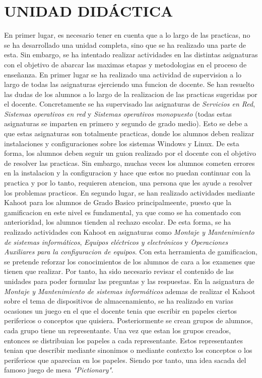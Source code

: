 \documentclass[spanish,12pt, a4paper,twoside]{paper}
\let\oldsection\section
\def\section{\cleardoublepage\oldsection}
\begin{document}
\section{UNIDAD DIDÁCTICA} %
\justify
En primer lugar, es necesario tener en cuenta que a lo largo de las practicas, no se ha desarrollado una unidad completa, sino que se ha realizado una parte de esta. Sin embargo, se ha intentado realizar actividades en las distintas asignaturas con el objetivo de abarcar las maximas etapas y metodologias en el proceso de enseñanza.
\justify
En primer lugar se ha realizado una actividad de supervision a lo largo de todas las asignaturas ejerciendo una funcion de docente. Se han resuelto las dudas de los alumnos a lo largo de la realizacion de las practicas sugeridas por el docente. Concretamente se ha supervisado las asignaturas de \textit{Servicios en Red}, \textit{Sistemas operativos en red} y \textit{Sistemas operativos monopuesto} (todas estas asignaturas se imparten en primero y segundo de grado medio). Esto se debe a que estas asignaturas son totalmente practicas, donde los alumnos deben realizar instalaciones y configuraciones sobre los sistemas Windows y Linux. De esta forma, los alumnos deben seguir un guion realizado por el docente con el objetivo de resolver las practicas. Sin embargo, muchas veces los alumnos cometen errores en la instalacion y la configuracion y hace que estos no puedan continuar con la practica y por lo tanto, requieren atencion, una persona que les ayude a resolver los problemas practicos.
\justify
En segundo lugar, se han realizado actividades mediante Kahoot para los alumnos de Grado Basico principalmeente, puesto que la gamificacion en este nivel es fundamental, ya que como se ha comentado con anterioridad, los alumnos tienden al rechazo escolar. De esta forma, se ha realizado actividades con Kahoot en asignaturas como \textit{Montaje y Mantenimiento de sistemas informáticos}, \textit{Equipos eléctricos y electrónicos} y \textit{Operaciones Auxiliares para la configuracion de equipos}. Con esta herramienta de gamificacion, se pretende reforzar los conocimientos de los alumnos de cara a los examenes que tienen que realizar. Por tanto, ha sido necesario revisar el contenido de las unidades para poder formular las preguntas y las respuestas.
\justify
En la asignatura de \textit{Montaje y Mantenimiento de sistemas informáticos} ademas de realizar el Kahoot sobre el tema de dispositivos de almacenamiento, se ha realizado en varias ocasiones un juego en el que el docente tenia que escribir en papeles ciertos perifericos o conceptos que quisiera. Posteriormente se crean grupos de alumnos, cada grupo tiene un representante. Una vez que estan los grupos creados, entonces se distribuian los papeles a cada representante. Estos representantes tenian que describir mediante sinonimos o mediante contexto los conceptos o los perifericos que aparecian en los papeles. Siendo por tanto, una idea sacada del famoso juego de mesa \textit{"Pictionary"}.
\end{document}
